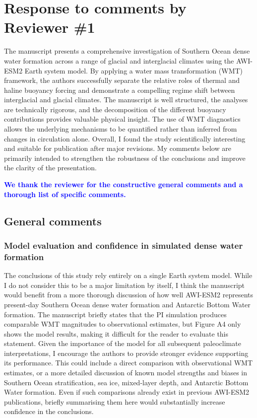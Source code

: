 \documentclass[pdflatex,sn-nature]{sn-jnl}
\begin{document}
\clearpage
\section*{Response to comments by Reviewer \#1}

\medskip
\noindent The manuscript presents a comprehensive investigation of Southern Ocean dense water formation across a range of glacial and interglacial climates using the AWI-ESM2 Earth system model. By applying a water mass transformation (WMT) framework, the authors successfully separate the relative roles of thermal and haline buoyancy forcing and demonstrate a compelling regime shift between interglacial and glacial climates. The manuscript is well structured, the analyses are technically rigorous, and the decomposition of the different buoyancy contributions provides valuable physical insight. The use of WMT diagnostics allows the underlying mechanisms to be quantified rather than inferred from changes in circulation alone. Overall, I found the study scientifically interesting and suitable for publication after major revisions. My comments below are primarily intended to strengthen the robustness of the conclusions and improve the clarity of the presentation.
\medskip

\noindent\textcolor{blue}{\textbf{We thank the reviewer for the constructive general comments and a thorough list of specific comments.}}


\subsection*{General comments}

\subsubsection*{Model evaluation and confidence in simulated dense water formation}

\medskip
\noindent The conclusions of this study rely entirely on a single Earth system model. While I do not consider this to be a major limitation by itself, I think the manuscript would benefit from a more thorough discussion of how well AWI-ESM2 represents present-day Southern Ocean dense water formation and Antarctic Bottom Water formation. The manuscript briefly states that the PI simulation produces comparable WMT magnitudes to observational estimates, but Figure A4 only shows the model results, making it difficult for the reader to evaluate this statement. Given the importance of the model for all subsequent paleoclimate interpretations, I encourage the authors to provide stronger evidence supporting its performance. This could include a direct comparison with observational WMT estimates, or a more detailed discussion of known model strengths and biases in Southern Ocean stratification, sea ice, mixed-layer depth, and Antarctic Bottom Water formation. Even if such comparisons already exist in previous AWI-ESM2 publications, briefly summarising them here would substantially increase confidence in the conclusions.
\medskip
\end{document}
